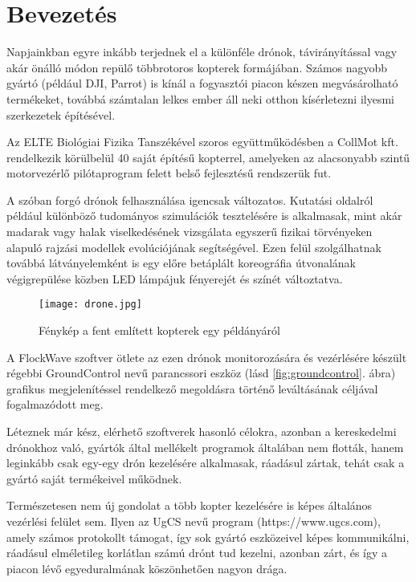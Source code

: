 \section{Bevezetés}

Napjainkban egyre inkább terjednek el a különféle drónok, távirányítással vagy
akár önálló módon repülő többrotoros kopterek formájában. Számos nagyobb gyártó
(például DJI, Parrot) is kínál a fogyasztói piacon készen megvásárolható
termékeket, továbbá számtalan lelkes ember áll neki otthon kísérletezni ilyesmi
szerkezetek építésével.

Az ELTE Biológiai Fizika Tanszékével szoros együttműködésben a CollMot kft.
rendelkezik körülbelül 40 saját építésű kopterrel, amelyeken az alacsonyabb
szintű motorvezérlő pilótaprogram felett belső fejlesztésű rendszerük fut.

A szóban forgó drónok felhasználása igencsak változatos. Kutatási oldalról
például különböző tudományos szimulációk tesztelésére is alkalmasak, mint
akár madarak vagy halak viselkedésének vizsgálata egyszerű fizikai törvényeken
alapuló rajzási modellek evolúciójának segítségével. Ezen felül szolgálhatnak
továbbá látványelemként is egy előre betáplált koreográfia útvonalának
végigrepülése közben LED lámpájuk fényerejét és színét változtatva.

\begin{figure}[h!]
  \center
  \texttt{[image: drone.jpg]}
  \caption{Fénykép a fent említett kopterek egy példányáról}
  \label{fig:drone}
\end{figure}

A FlockWave szoftver ötlete az ezen drónok monitorozására és vezérlésére készült
régebbi GroundControl nevű parancssori eszköz (lásd \ref{fig:groundcontrol}.
ábra) grafikus megjelenítéssel rendelkező megoldásra történő leváltásának
céljával fogalmazódott meg.


Léteznek már kész, elérhető szoftverek hasonló célokra, azonban a kereskedelmi
drónokhoz való, gyártók által mellékelt programok általában nem flották, hanem
leginkább csak egy-egy drón kezelésére alkalmasak, ráadásul zártak, tehát csak
a gyártó saját termékeivel működnek.

Természetesen nem új gondolat a több kopter kezelésére is képes általános
vezérlési felület sem. Ilyen az UgCS nevű program (https://www.ugcs.com), amely
számos protokollt támogat, így sok gyártó eszközeivel képes kommunikálni,
ráadásul elméletileg korlátlan számú drónt tud kezelni, azonban zárt, és így a
piacon lévő egyeduralmának köszönhetően nagyon drága.

